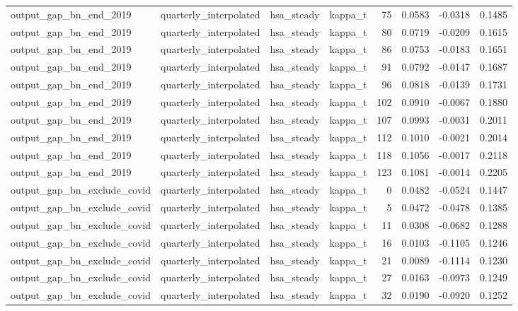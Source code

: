 \begin{tabular}{llllrrrr}
output\_gap\_bn\_end\_2019 & quarterly\_interpolated & hsa\_steady & kappa\_t & 75 & 0.0583 & -0.0318 & 0.1485 \\
output\_gap\_bn\_end\_2019 & quarterly\_interpolated & hsa\_steady & kappa\_t & 80 & 0.0719 & -0.0209 & 0.1615 \\
output\_gap\_bn\_end\_2019 & quarterly\_interpolated & hsa\_steady & kappa\_t & 86 & 0.0753 & -0.0183 & 0.1651 \\
output\_gap\_bn\_end\_2019 & quarterly\_interpolated & hsa\_steady & kappa\_t & 91 & 0.0792 & -0.0147 & 0.1687 \\
output\_gap\_bn\_end\_2019 & quarterly\_interpolated & hsa\_steady & kappa\_t & 96 & 0.0818 & -0.0139 & 0.1731 \\
output\_gap\_bn\_end\_2019 & quarterly\_interpolated & hsa\_steady & kappa\_t & 102 & 0.0910 & -0.0067 & 0.1880 \\
output\_gap\_bn\_end\_2019 & quarterly\_interpolated & hsa\_steady & kappa\_t & 107 & 0.0993 & -0.0031 & 0.2011 \\
output\_gap\_bn\_end\_2019 & quarterly\_interpolated & hsa\_steady & kappa\_t & 112 & 0.1010 & -0.0021 & 0.2014 \\
output\_gap\_bn\_end\_2019 & quarterly\_interpolated & hsa\_steady & kappa\_t & 118 & 0.1056 & -0.0017 & 0.2118 \\
output\_gap\_bn\_end\_2019 & quarterly\_interpolated & hsa\_steady & kappa\_t & 123 & 0.1081 & -0.0014 & 0.2205 \\
output\_gap\_bn\_exclude\_covid & quarterly\_interpolated & hsa\_steady & kappa\_t & 0 & 0.0482 & -0.0524 & 0.1447 \\
output\_gap\_bn\_exclude\_covid & quarterly\_interpolated & hsa\_steady & kappa\_t & 5 & 0.0472 & -0.0478 & 0.1385 \\
output\_gap\_bn\_exclude\_covid & quarterly\_interpolated & hsa\_steady & kappa\_t & 11 & 0.0308 & -0.0682 & 0.1288 \\
output\_gap\_bn\_exclude\_covid & quarterly\_interpolated & hsa\_steady & kappa\_t & 16 & 0.0103 & -0.1105 & 0.1246 \\
output\_gap\_bn\_exclude\_covid & quarterly\_interpolated & hsa\_steady & kappa\_t & 21 & 0.0089 & -0.1114 & 0.1230 \\
output\_gap\_bn\_exclude\_covid & quarterly\_interpolated & hsa\_steady & kappa\_t & 27 & 0.0163 & -0.0973 & 0.1249 \\
output\_gap\_bn\_exclude\_covid & quarterly\_interpolated & hsa\_steady & kappa\_t & 32 & 0.0190 & -0.0920 & 0.1252 \\

\end{tabular}
